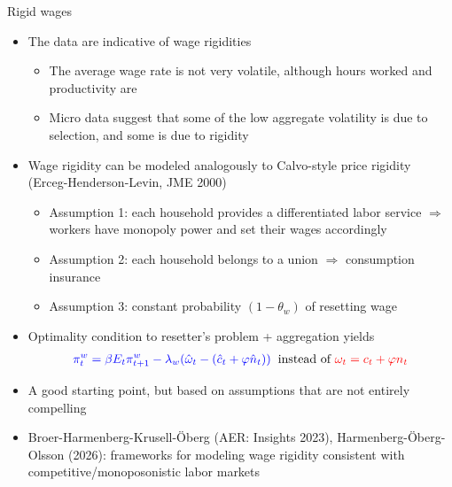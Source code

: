 \documentclass[9pt,xcolor={dvipsnames}]{beamer}
\newcommand{\bit}{\begin{itemize}}
\newcommand{\eit}{\end{itemize}}
\newcommand{\bc}{\color{blue}}
\newcommand{\rc}{\color{red}}
\begin{document}
\begin{frame}{Rigid wages}

\bit
\setlength\itemsep{1.5em}
\item The data are indicative of wage rigidities
\bit
\setlength\itemsep{0.5em}
\item The average wage rate is not very volatile, although hours worked and productivity are

\item Micro data suggest that some of the low aggregate volatility is due to selection, and some is due to rigidity
\eit

\item Wage rigidity can be modeled analogously to Calvo-style price rigidity (Erceg-Henderson-Levin, JME 2000)
\bit
\setlength\itemsep{0.5em}
\item Assumption 1: each household provides a differentiated labor service $\Rightarrow$ workers have monopoly power and set their wages accordingly

\item Assumption 2: each household belongs to a union $\Rightarrow$ consumption insurance 

\item Assumption 3: constant probability $(1-\theta_w)$ of resetting wage
\eit

\item Optimality condition to resetter's problem + aggregation yields
\begin{eqnarray}
{\bc \pi^w_t = \beta E_t  \pi^w_{t+1} - \lambda_w (\hat \omega_t- (\hat c_t + \varphi \hat n_t))} \hspace{2mm} \text{instead of } {\rc\omega_t = c_t + \varphi n_t} \nonumber
\end{eqnarray}

\item A good starting point, but based on assumptions that are not entirely compelling

\item Broer-Harmenberg-Krusell-\"{O}berg (AER: Insights 2023), Harmenberg-\"{O}berg-Olsson (2026): frameworks for modeling wage rigidity consistent with competitive/monoposonistic labor markets
\eit

\end{frame}
\end{document}
